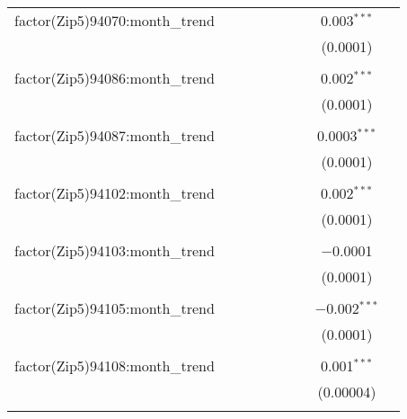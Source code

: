 \begin{table}[H]
{\begin{tabular}{@{\extracolsep{5pt}}lcccccccc}
  factor(Zip5)94070:month\_trend &  &  &  &  &  &  & 0.003$^{***}$ &  \\  

   &  &  &  &  &  &  & (0.0001) &  \\  

   & & & & & & & & \\  

  factor(Zip5)94086:month\_trend &  &  &  &  &  &  & 0.002$^{***}$ &  \\  

   &  &  &  &  &  &  & (0.0001) &  \\  

   & & & & & & & & \\  

  factor(Zip5)94087:month\_trend &  &  &  &  &  &  & 0.0003$^{***}$ &  \\  

   &  &  &  &  &  &  & (0.0001) &  \\  

   & & & & & & & & \\  

  factor(Zip5)94102:month\_trend &  &  &  &  &  &  & 0.002$^{***}$ &  \\  

   &  &  &  &  &  &  & (0.0001) &  \\  

   & & & & & & & & \\  

  factor(Zip5)94103:month\_trend &  &  &  &  &  &  & $-$0.0001 &  \\  

   &  &  &  &  &  &  & (0.0001) &  \\  

   & & & & & & & & \\  

  factor(Zip5)94105:month\_trend &  &  &  &  &  &  & $-$0.002$^{***}$ &  \\  

   &  &  &  &  &  &  & (0.0001) &  \\  

   & & & & & & & & \\  

  factor(Zip5)94108:month\_trend &  &  &  &  &  &  & 0.001$^{***}$ &  \\  

   &  &  &  &  &  &  & (0.00004) &  \\  

   & & & & & & & & \\  


\end{tabular}}
\end{table}
